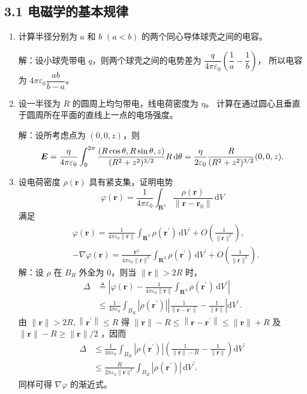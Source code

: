 \subsection{3.1 电磁学的基本规律}
\begin{enumerate}
\item 计算半径分别为 $a$ 和 $b$ $(a<b)$ 的两个同心导体球壳之间的电容。

解：设小球壳带电 $q$，则两个球壳之间的电势差为 $\dfrac{q}{4\pi\varepsilon_{0}}\left(\dfrac{1}{a}-\dfrac{1}{b}\right)$，
所以电容为 $4\pi\varepsilon_{0}\dfrac{ab}{b-a}$。

\item 设一半径为 $R$ 的圆周上均匀带电，线电荷密度为 $\eta$。
计算在通过圆心且垂直于圆周所在平面的直线上一点的电场强度。

解：设所考虑点为 $(0,0,z)$，则
$$\boldsymbol{E}=\frac{\eta}{4\pi\varepsilon_{0}} \int_{0}^{2\pi} \frac{(R\cos\theta, R\sin\theta, z)}{(R^{2}+z^{2})^{3/2}} R \, {\rm d} \theta
=\frac{\eta}{2\varepsilon_{0}} \frac{R}{(R^{2}+z^{2})^{3/2}}(0,0,z).$$

\item 设电荷密度 $\rho(\boldsymbol{r})$ 具有紧支集，证明电势
$$\varphi(\boldsymbol{r})=\frac{1}{4\pi\varepsilon_0}\int_{\mathbf{R}^3}\frac{\rho(\boldsymbol{r})}{\|\boldsymbol{r}-\boldsymbol{r}_0\|}\,\mathrm{d}V$$
满足
\begin{align*}
& \varphi(\boldsymbol{r})=\frac{1}{4\pi\varepsilon_0\|\boldsymbol{r}\|}\int_{\mathbf{R}^3} \rho(\boldsymbol{r}^{\prime})\,\mathrm{d}V^{\prime}+O\left(\frac{1}{\|\boldsymbol{r}\|^2}\right), \\
& -\nabla \varphi(\boldsymbol{r})=\frac{\boldsymbol{r}^2}{4\pi\varepsilon_0\|\boldsymbol{r}\|^3} \int_{\mathbf{R}^3} \rho(\boldsymbol{r}^{\prime})\,\mathrm{d}V^{\prime}+O\left(\frac{1}{\|\boldsymbol{r}\|^3}\right).
\end{align*}
解：设 $\rho$ 在 $B_{R}$ 外全为 $0$，则当 $\|\boldsymbol{r}\|>2R$ 时，
\begin{align*}
\Delta & \triangleq\left|\varphi(\boldsymbol{r})-\frac{1}{4\pi\varepsilon_{0}\|\boldsymbol{r}\|} \int_{\mathbf{R}^{3}} \rho(\boldsymbol{r}^{\prime}) \, \mathrm{d} V^{\prime}\right| \\
& \leqslant \frac{1}{4\pi\varepsilon_{0}} \int_{B_{R}}\left|\rho(\boldsymbol{r}^{\prime})\right|\left|\frac{1}{\left\|\boldsymbol{r}-\boldsymbol{r}^{\prime}\right\|}-\frac{1}{\|\boldsymbol{r}\|}\right| \mathrm{d} V^{\prime}.
\end{align*}
由 $\|\boldsymbol{r}\|>2R,\left\|\boldsymbol{r}^{\prime}\right\| \leqslant R$ 得 $\|\boldsymbol{r}\|-R \leqslant\left\|\boldsymbol{r}-\boldsymbol{r}^{\prime}\right\| \leqslant\|\boldsymbol{r}\|+R$ 及 $\|\boldsymbol{r}\|-R \geqslant\|\boldsymbol{r}\| / 2$ ，因而
\begin{align*}
\Delta & \leqslant \frac{1}{4\pi\varepsilon_{0}} \int_{B_{R}}\left|\rho(\boldsymbol{r}^{\prime})\right|\left(\frac{1}{\|\boldsymbol{r}\|-R}-\frac{1}{\|\boldsymbol{r}\|}\right) \mathrm{d} V^{\prime} \\
& \leqslant \frac{R}{2\pi\varepsilon_{0}\|\boldsymbol{r}\|^{2}} \int_{B_{R}} |\rho(\boldsymbol{r}^{\prime})| \, \mathrm{d} V^{\prime}.
\end{align*}
同样可得 $\nabla \varphi$ 的渐近式。


\end{enumerate}

